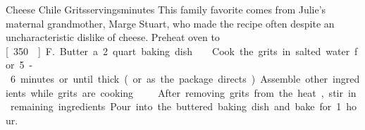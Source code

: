 \begin{recipe}{Cheese Chile Grits}{\unit[6]{servings}}{\unit[90]{minutes}}
\freeform This family favorite comes from Julie's maternal grandmother, Marge
Stuart, who made the recipe often despite an uncharacteristic dislike
of cheese.
\newstep Preheat oven to \unit[350\0]{F.} Butter a 2 quart baking dish.
Cook the grits in salted water for 5-6 minutes or until thick (or as
the package directs). Assemble other ingredients while grits are
cooking.
After removing grits from the heat, stir in remaining
ingredients. Pour into the buttered baking dish and bake for 1 hour.
\end{recipe}

